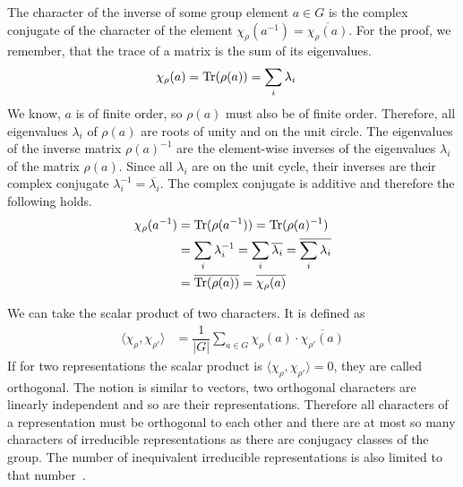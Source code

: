 The character of the inverse of some group element $a \in G$ is the complex conjugate of the character of the element $\chi_\rho(a^{-1}) = \overline{\chi_\rho(a)}$.
For the proof, we remember, that the trace of a matrix is the sum of its eigenvalues.
\begin{align}
    \chi_\rho(a) & = \operatorname{Tr}(\rho(a)) = \sum_i \lambda_i
\end{align}
We know, $a$ is of finite order, so $\rho(a)$ must also be of finite order.
Therefore, all eigenvalues $\lambda_i$ of $\rho(a)$ are roots of unity and on the unit circle.
The eigenvalues of the inverse matrix $\rho(a)^{-1}$ are the element-wise inverses of the eigenvalues $\lambda_i$ of the matrix $\rho(a)$.
Since all $\lambda_i$ are on the unit cycle, their inverses are their complex conjugate $\lambda_i^{-1} = \overline{\lambda_i}$.
The complex conjugate is additive and therefore the following holds.
\begin{subequations}
\begin{align}
    \chi_\rho(a^{-1}) & = \operatorname{Tr}(\rho(a^{-1})) = \operatorname{Tr}(\rho(a)^{-1}) \\
    & = \sum_i \lambda_i^{-1} = \sum_i \overline{\lambda_i} = \overline{\sum_i \lambda_i} \\
    & = \overline{\operatorname{Tr}(\rho(a))} = \overline{\chi_\rho(a)}
\end{align}
\end{subequations}

We can take the scalar product of two characters.
It is defined as
\begin{align}
    \langle \chi_\rho, \chi_{\rho'} \rangle & = \dfrac{1}{|G|} \sum_{a \in G} \chi_\rho(a) \cdot \overline{\chi_{\rho'}(a)}
\end{align}
If for two representations the scalar product is $\langle \chi_\rho, \chi_{\rho'} \rangle = 0$, they are called orthogonal.
The notion is similar to vectors, two orthogonal characters are linearly independent and so are their representations.
Therefore all characters of a representation must be orthogonal to each other and there are at most so many characters of irreducible representations as there are conjugacy classes of the group.
The number of inequivalent irreducible representations is also limited to that number~\cite{fulton2013}.

